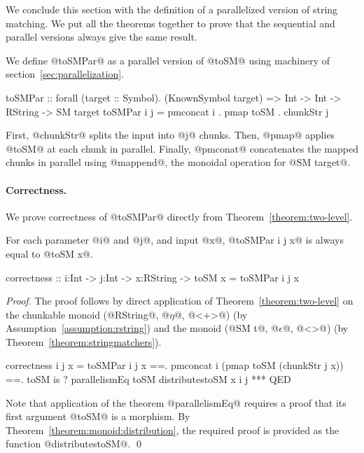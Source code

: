 We conclude this section with
the definition of a parallelized version of string matching.
%
We put all the theorems together to prove 
that the sequential and parallel versions always give the same result.

We define @toSMPar@ as a parallel version of @toSM@ using machinery of section~\ref{sec:parallelization}.
\begin{code}
toSMPar :: forall (target :: Symbol). (KnownSymbol target)
        => Int -> Int -> RString -> SM target
toSMPar i j = pmconcat i . pmap toSM . chunkStr j
\end{code}
%
First, @chunkStr@ splits the input into @j@ chunks.
%
Then, @pmap@ applies @toSM@ at each chunk in parallel.
Finally, @pmconat@ concatenates the mapped chunks in parallel
using @mappend@, the monoidal operation for @SM target@.

\paragraph{Correctness.}
We prove correctness of @toSMPar@ directly from
Theorem~\ref{theorem:two-level}.
\begin{theorem}\label{theorem:correctness}
For each parameter @i@ and @j@, and input @x@,
@toSMPar i j x@ is always equal to @toSM x@.
\begin{code}
correctness :: i:Int -> j:Int -> x:RString
             -> {toSM x = toSMPar i j x}
\end{code}
\end{theorem}

\begin{proof}
The proof follows by direct application of Theorem~\ref{theorem:two-level}
on the chunkable monoid (@RString@, @$\eta$@, @<+>@) (by Assumption~\ref{assumption:rstring})
and the monoid (@SM t@, @$\epsilon$@, @<>@) (by Theorem~\ref{theorem:stringmatchers}).
%
\begin{code}
correctness i j x
  =   toSMPar i j x
  ==. pmconcat i (pmap toSM (chunkStr j x))
  ==. toSM is
    ? parallelismEq toSM distributestoSM x i j
  *** QED
\end{code}
%
Note that application of the theorem @parallelismEq@
requires a proof that its first argument @toSM@ is a morphism.
%
By Theorem~\ref{theorem:monoid:distribution},
the required proof is provided as the function @distributestoSM@.
\qed\end{proof}

